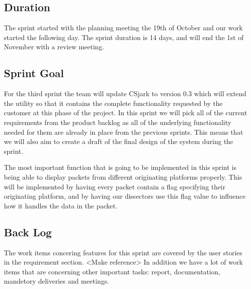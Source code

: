\subsection{Duration}

The sprint started with the planning meeting the 19th of October and our work started the following day. The sprint duration is 14 days, and will end the 1st of November with a review meeting. 


\subsection{Sprint Goal}
For the third sprint the team will update CSjark to version 0.3 which will extend the utility so that it contains the complete functionality requested by the customer at this phase of the project. In this sprint we will pick all of the current requirements from the product backlog as all of the underlying functionality needed for them are already in place from the previous sprints. This means that we will also aim to create a draft of the final design of the system during the sprint.

The most important function that is going to be implemented in this sprint is being able to display packets from different originating platforms properly. This will be implemented by having every packet contain a flag specifying their originating platform, and by having our dissectors use this flag value to influence how it handles the data in the packet.

\subsection{Back Log}
The work items concering features for this sprint are covered by the user stories in the requirement section. <Make reference>
In addition we have a lot of work items that are concerning other important tasks: report, documentation, mandetory deliveries and meetings. 


